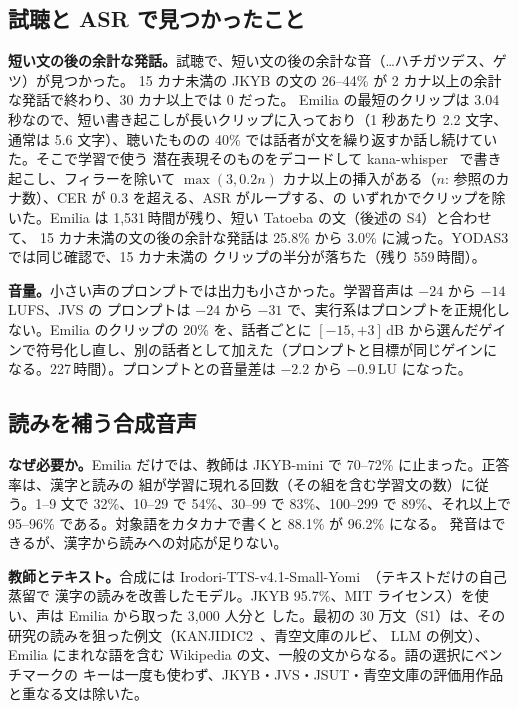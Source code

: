 \documentclass[10pt,a4paper,twocolumn]{article}
\begin{document}
\subsection{試聴と ASR で見つかったこと}\label{sec:found}
\textbf{短い文の後の余計な発話。}試聴で、短い文の後の余計な音（…ハチガツデス、ゲツ）が見つかった。
15 カナ未満の JKYB の文の 26--44\% が 2 カナ以上の余計な発話で終わり、30 カナ以上では 0 だった。
Emilia の最短のクリップは 3.04 秒なので、短い書き起こしが長いクリップに入っており（1 秒あたり 2.2
文字、通常は 5.6 文字）、聴いたものの 40\% では話者が文を繰り返すか話し続けていた。そこで学習で使う
潜在表現そのものをデコードして kana-whisper~\cite{kanawhisper} で書き起こし、フィラーを除いて
$\max(3,0.2n)$ カナ以上の挿入がある（$n$: 参照のカナ数）、CER が 0.3 を超える、ASR がループする、の
いずれかでクリップを除いた。Emilia は 1,531\,時間が残り、短い Tatoeba の文（後述の S4）と合わせて、
15 カナ未満の文の後の余計な発話は 25.8\% から 3.0\% に減った。YODAS3 では同じ確認で、15 カナ未満の
クリップの半分が落ちた（残り 559\,時間）。

\textbf{音量。}小さい声のプロンプトでは出力も小さかった。学習音声は $-24$ から $-14$\,LUFS、JVS の
プロンプトは $-24$ から $-31$ で、実行系はプロンプトを正規化しない。Emilia のクリップの 20\% を、話者ごとに
$[-15,+3]$\,dB から選んだゲインで符号化し直し、別の話者として加えた（プロンプトと目標が同じゲインに
なる。227\,時間）。プロンプトとの音量差は $-2.2$ から $-0.9$\,LU になった。

\subsection{読みを補う合成音声}
\textbf{なぜ必要か。}Emilia だけでは、教師は JKYB-mini で 70--72\% に止まった。正答率は、漢字と読みの
組が学習に現れる回数（その組を含む学習文の数）に従う。1--9 文で 32\%、10--29 で 54\%、30--99 で
83\%、100--299 で 89\%、それ以上で 95--96\% である。対象語をカタカナで書くと 88.1\% が 96.2\% になる。
発音はできるが、漢字から読みへの対応が足りない。

\textbf{教師とテキスト。}合成には Irodori-TTS-v4.1-Small-Yomi~\cite{yomi}（テキストだけの自己蒸留で
漢字の読みを改善したモデル。JKYB 95.7\%、MIT ライセンス）を使い、声は Emilia から取った 3,000 人分と
した。最初の 30 万文（S1）は、その研究の読みを狙った例文（KANJIDIC2~\cite{jmdict}、青空文庫のルビ、
LLM の例文）、Emilia にまれな語を含む Wikipedia の文、一般の文からなる。語の選択にベンチマークの
キーは一度も使わず、JKYB・JVS・JSUT・青空文庫の評価用作品と重なる文は除いた。
\end{document}
